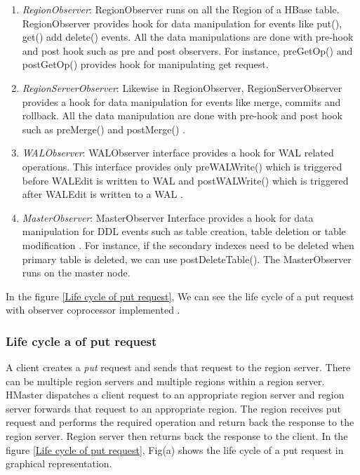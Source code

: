 \documentclass[11pt,a4paper,bibtotoc,idxtotoc,headsepline,footsepline,footexclude,BCOR12mm,DIV13]{scrbook}
\begin{document}
\begin{enumerate}
    
\item \emph{RegionObserver}: RegionObserver runs on all the Region of a HBase table. RegionObserver provides hook for data manipulation for events like put(), get() add delete() events. All the data manipulations are done with pre-hook and post hook \cite{hbase:essential} such as pre and post observers. For instance, preGetOp() and postGetOp() provides hook for manipulating get request. 

\item \emph{RegionServerObserver}: Likewise in RegionObserver, RegionServerObserver provides a hook for data manipulation for events like merge, commits and rollback. All the data manipulation are done with pre-hook and post hook such as preMerge() and postMerge() \cite{hbase:essential}. 

\item \emph{WALObserver}: WALObserver interface provides a hook for WAL \cite{hbase:essential} related operations. This interface provides only preWALWrite() which is triggered before WALEdit is written to WAL and postWALWrite() which is triggered after WALEdit is written to a WAL \cite{hbase:essential}.

\item \emph{MasterObserver}: MasterObserver Interface provides a hook for data manipulation for DDL events such as table creation, table deletion or table modification \cite{cloudera:instandupg}. For instance, if the secondary indexes need to be deleted when primary table is deleted, we can use postDeleteTable(). The MasterObserver runs on the master node.

\end{enumerate}


In the figure \ref{Life cycle of put request}, We can see the life cycle of a put request with observer coprocessor implemented \cite{coprocessor:detail}.

\subsubsection{Life cycle a of put request}
\label{subsubsec:Life cycle of put request}

A client creates a \emph{put} request and sends that request to the region server. There can be multiple region servers and multiple regions within a region server. HMaster dispatches a client request to an appropriate region server and region server forwards that request to an appropriate region. The region receives put request and performs the required operation and return back the response to the region server. Region server then returns back the response to the client. In the figure \ref{Life cycle of put request}, Fig(a) shows the life cycle of a put request in graphical representation. 
\end{document}
